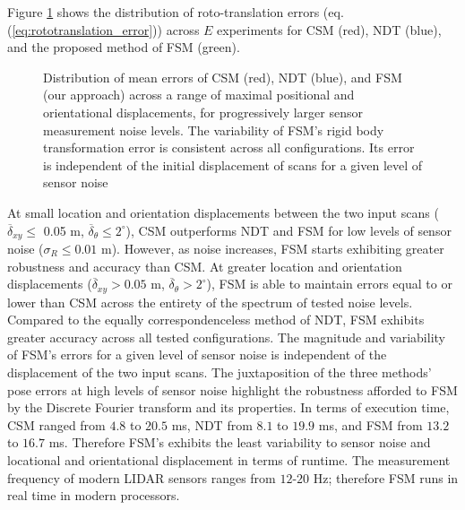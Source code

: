 Figure \ref{fig:errors_sm} shows the distribution of roto-translation errors
(eq. (\ref{eq:rototranslation_error})) across $E$ experiments for CSM (red),
NDT (blue), and the proposed method of FSM (green).

\begin{figure}[]\centering
  
  \caption{\small Distribution of mean errors of CSM (red), NDT (blue), and
           FSM (our approach) across a range of maximal positional and
           orientational displacements, for progressively larger sensor
           measurement noise levels. The variability of FSM's rigid body
           transformation error is consistent across all configurations. Its
           error is independent of the initial displacement of scans for a
           given level of sensor noise}
  \label{fig:errors_sm}
\end{figure}

At small location and orientation displacements between the two input scans
($\overline{\delta}_{xy} \leq $ 0.05 m,
$\overline{\delta}_\theta \leq 2^\circ$), CSM outperforms NDT and FSM for low
levels of sensor noise ($\sigma_R \leq 0.01$ m). However, as noise increases,
FSM starts exhibiting greater robustness and accuracy than CSM. At
greater location and orientation displacements
($\overline{\delta}_{xy} > 0.05$ m,
$\overline{\delta}_\theta > 2^\circ$), FSM is able to maintain errors equal to
or lower than CSM across the entirety of the spectrum of tested noise levels.
Compared to the equally correspondenceless method of NDT, FSM exhibits greater
accuracy across all tested configurations. The magnitude and variability of
FSM's errors for a given level of sensor noise is independent of the
displacement of the two input scans. The juxtaposition of the three methods'
pose errors at high levels of sensor noise highlight the robustness afforded to
FSM by the Discrete Fourier transform and its properties. In terms of execution
time, CSM ranged from $4.8$ to $20.5$ ms, NDT from $8.1$ to $19.9$ ms, and FSM
from $13.2$ to $16.7$ ms. Therefore FSM's exhibits the least variability to
sensor noise and locational and orientational displacement in terms of runtime.
The measurement frequency of modern LIDAR sensors ranges from $12$-$20$ Hz;
therefore FSM runs in real time in modern processors.
